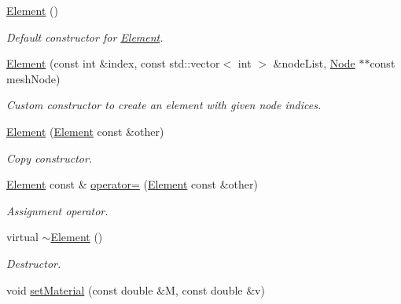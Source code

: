 \begin{DoxyCompactItemize}
\item 
\mbox{\label{class_element_ab0d0e20be9a36ae676202db753faeec9}} 
\mbox{\hyperlink{class_element_ab0d0e20be9a36ae676202db753faeec9}{Element}} ()
\begin{DoxyCompactList}\small\item\em Default constructor for \mbox{\hyperlink{class_element}{Element}}. \end{DoxyCompactList}\item 
\mbox{\hyperlink{class_element_a05c744ed2de597b38da74c7765f5ed1b}{Element}} (const int \&index, const std\+::vector$<$ int $>$ \&node\+List, \mbox{\hyperlink{class_node}{Node}} $\ast$$\ast$const mesh\+Node)
\begin{DoxyCompactList}\small\item\em Custom constructor to create an element with given node indices. \end{DoxyCompactList}\item 
\mbox{\label{class_element_a68700ab3d0e5551cb456e91c3a8fc61b}} 
\mbox{\hyperlink{class_element_a68700ab3d0e5551cb456e91c3a8fc61b}{Element}} (\mbox{\hyperlink{class_element}{Element}} const \&other)
\begin{DoxyCompactList}\small\item\em Copy constructor. \end{DoxyCompactList}\item 
\mbox{\label{class_element_a2baffaa8af3b584a906206d0381cd204}} 
\mbox{\hyperlink{class_element}{Element}} const  \& \mbox{\hyperlink{class_element_a2baffaa8af3b584a906206d0381cd204}{operator=}} (\mbox{\hyperlink{class_element}{Element}} const \&other)
\begin{DoxyCompactList}\small\item\em Assignment operator. \end{DoxyCompactList}\item 
virtual \mbox{\hyperlink{class_element_a13d54ba9c08b6bec651402f1c2bb002c}{$\sim$\+Element}} ()
\begin{DoxyCompactList}\small\item\em Destructor. \end{DoxyCompactList}\item 
void \mbox{\hyperlink{class_element_ad74b47354fe0608c9baba38c79e5b549}{set\+Material}} (const double \&M, const double \&v)
$$
\end{DoxyCompactItemize}
